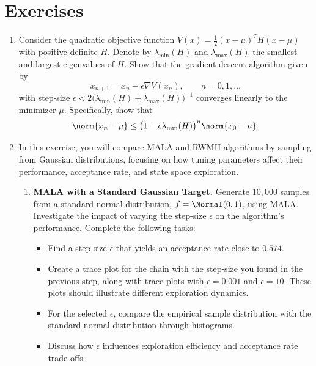 \section{Exercises}
\label{sec:6.5}

\begin{enumerate}

\item[\textbf{6.1}]
Consider the quadratic objective function $V(x) = \frac{1}{2}(x-\mu)^T H(x-\mu)$ with
positive definite $H$. Denote by $\lambda_{\min}(H)$ and $\lambda_{\max}(H)$ the smallest and
largest eigenvalues of $H$. Show that the gradient descent algorithm given by
\[
  x_{n+1} = x_n - \epsilon\nabla V(x_n), \qquad n = 0, 1, \ldots
\]
with step-size $\epsilon < 2\bigl(\lambda_{\min}(H) + \lambda_{\max}(H)\bigr)^{-1}$ converges
linearly to the minimizer $\mu$. Specifically, show that
\[
  \norm{x_n - \mu} \le \bigl(1 - \epsilon\lambda_{\min}(H)\bigr)^n \norm{x_0 - \mu}.
\]

\item[\textbf{6.2}]
In this exercise, you will compare MALA and RWMH algorithms by sampling from Gaussian
distributions, focusing on how tuning parameters affect their performance, acceptance rate, and
state space exploration.

\begin{enumerate}[label=\alph*)]
  \item \textbf{MALA with a Standard Gaussian Target.}
    Generate $10{,}000$ samples from a standard normal distribution, $f = \Normal(0,1)$, using
    MALA. Investigate the impact of varying the step-size $\epsilon$ on the algorithm's
    performance. Complete the following tasks:
    \begin{itemize}
      \item Find a step-size $\epsilon$ that yields an acceptance rate close to $0.574$.
      \item Create a trace plot for the chain with the step-size you found in the previous
        step, along with trace plots with $\epsilon = 0.001$ and $\epsilon = 10$. These plots
        should illustrate different exploration dynamics.
      \item For the selected $\epsilon$, compare the empirical sample distribution with the
        standard normal distribution through histograms.
      \item Discuss how $\epsilon$ influences exploration efficiency and acceptance rate
        trade-offs.
    \end{itemize}


\end{enumerate}
\end{enumerate}
